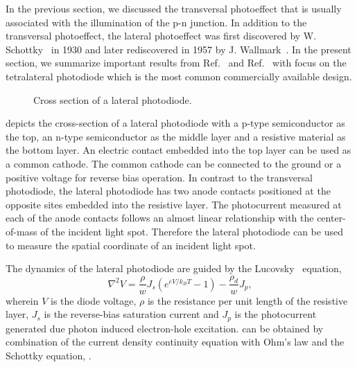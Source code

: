 In the previous section, we discussed the transversal photoeffect that is usually associated with the illumination of the p-n junction.
In addition to the transversal photoeffect, the lateral photoeffect was first discovered by W. Schottky~\cite{Schottky30} in 1930 and later rediscovered in 1957 by J. Wallmark~\cite{Wallmark57}.
In the present section, we summarize important results from Ref.~\cite{Noorlag74} and Ref.~\cite{Woltring75} with focus on the tetralateral photodiode which is the most common commercially available design.
\begin{figure}[H]
	\centering
	\caption{Cross section of a lateral photodiode.}\label{fig:lateral_photodiode_cross_section}
\end{figure}
 depicts the cross-section of a lateral photodiode with a p-type semiconductor as the top, an n-type semiconductor as the middle layer and a resistive material as the bottom layer.
An electric contact embedded into the top layer can be used as a common cathode.
The common cathode can be connected to the ground or a positive voltage for reverse bias operation.
In contrast to the transversal photodiode, the lateral photodiode has two anode contacts positioned at the opposite sites embedded into the resistive layer.
The photocurrent measured at each of the anode contacts follows an almost linear relationship with the center-of-mass of the incident light spot.
Therefore the lateral photodiode can be used to measure the spatial coordinate of an incident light spot.

The dynamics of the lateral photodiode are guided by the Lucovsky~\cite{Lucovsky60} equation,
\begin{equation}
	\nabla^2V=\frac{\rho}{w}J_s\left(e^{eV/k_BT}-1\right)-\frac{\rho_d}{w}J_p\label{eq:lucovsky_exact},
\end{equation}
wherein $V$ is the diode voltage, $\rho$ is the resistance per unit length of the resistive layer, $J_s$ is the reverse-bias saturation current and $J_p$ is the photocurrent generated due photon induced electron-hole excitation.
 can be obtained by combination of the current density continuity equation with Ohm's law and the Schottky equation, .

